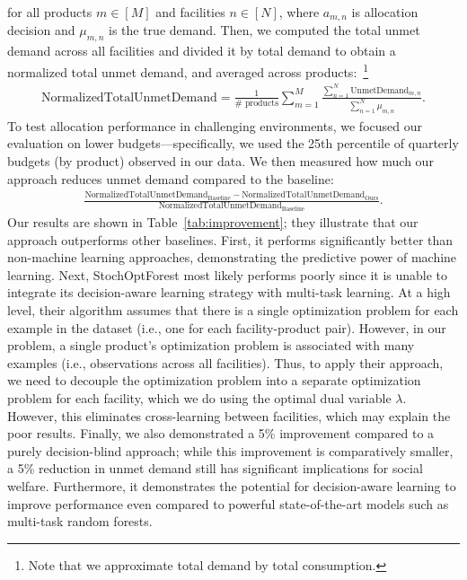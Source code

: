\documentclass[12pt]{article}
\begin{document}
for all products $m\in[M]$ and facilities $n\in[N]$, where $a_{m,n}$ is allocation decision and $\mu_{m,n}$ is the true demand. Then, we computed the total unmet demand across all facilities and divided it by total demand to obtain a normalized total unmet demand, and averaged across products:~\footnote{Note that we approximate total demand by total consumption.}
\begin{align}
\text{NormalizedTotalUnmetDemand}=\frac{1}{\#\text{ products}}\sum_{m=1}^M\frac{\sum_{n=1}^N\text{UnmetDemand}_{m,n}}{\sum_{n=1}^N\mu_{m,n}}.
\end{align}
To test allocation performance in challenging environments, we focused our evaluation on lower budgets---specifically, we used the 25th percentile of quarterly budgets (by product) observed in our data. We then measured how much our approach reduces unmet demand compared to the baseline:
\begin{align}
\frac{\text{NormalizedTotalUnmetDemand}_{\text{Baseline}}-\text{NormalizedTotalUnmetDemand}_{\text{Ours}}}{\text{NormalizedTotalUnmetDemand}_{\text{Baseline}}}.
\end{align}
Our results are shown in Table~\ref{tab:improvement}; they illustrate that our approach outperforms other baselines. First, it performs significantly better than non-machine learning approaches, demonstrating the predictive power of machine learning. Next, StochOptForest most likely performs poorly since it is unable to integrate its decision-aware learning strategy with multi-task learning. At a high level, their algorithm assumes that there is a single optimization problem for each example in the dataset (i.e., one for each facility-product pair). However, in our problem, a single product's optimization problem is associated with many examples (i.e., observations across all facilities). Thus, to apply their approach, we need to decouple the optimization problem into a separate optimization problem for each facility, which we do using the optimal dual variable $\lambda$. However, this eliminates cross-learning between facilities, which may explain the poor results.
Finally, we also demonstrated a 5\% improvement compared to a purely decision-blind approach; while this improvement is comparatively smaller, a 5\% reduction in unmet demand still has significant implications for social welfare. Furthermore, it demonstrates the potential for decision-aware learning to improve performance even compared to powerful state-of-the-art models such as multi-task random forests.
\end{document}

